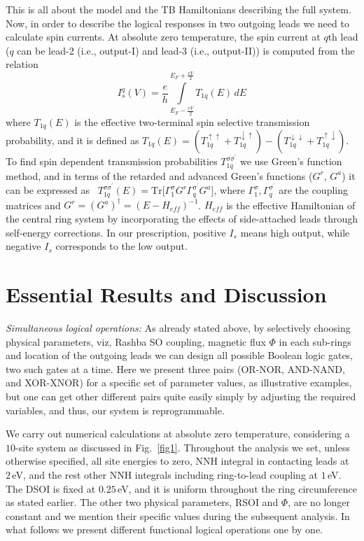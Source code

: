 \documentclass[doublecol]{epl2}
\begin{document}
This is all about the model and the TB Hamiltonians describing the full 
system. Now, in order to describe the logical responses in two outgoing 
leads we need to calculate spin currents. At absolute zero temperature, 
the spin current at $q$th lead ($q$ can be lead-2 (i.e., output-I) and 
lead-3 (i.e., output-II)) is computed from the relation~\cite{datta}
\begin{equation}
I_s^q(V) = \frac{e}{h}
\int\limits_{E_F-\frac{eV}{2}}^{E_F+ \frac{eV}{2}}T_{1q}(E) \, dE
\label{eq3}
\end{equation}
where $T_{1q}(E)$ is the effective two-terminal spin selective transmission 
probability, and it is defined as 
$T_{1q}(E)=(T_{1q}^{\uparrow\uparrow}+T_{1q}^{\downarrow\uparrow})-
(T_{1q}^{\downarrow\downarrow}+T_{1q}^{\uparrow\downarrow})$. To find spin 
dependent transmission probabilities $T_{1q}^{\sigma\sigma^{\prime}}$
we use Green's function method, and in terms of the retarded and advanced 
Green's functions ($G^r$, $G^a$) it can be expressed as~\cite{datta,car,fl} 
$T_{1q}^{\sigma\sigma^{\prime}}(E) = \mbox{Tr}\big[\Gamma_1^{\sigma} 
G^r \Gamma_q^{\sigma^{\prime}} G^a\big]$, where 
$\Gamma_1^{\sigma}, \Gamma_q^{\sigma^{\prime}}$ are the coupling matrices and 
$G^r=(G^a)^{\dagger}=(E-H_{eff})^{-1}$. $H_{eff}$ is the effective Hamiltonian 
of the central ring system by incorporating the effects of side-attached leads 
through self-energy corrections. In our prescription, positive $I_s$ means 
high output, while negative $I_s$ corresponds to the low output.

\section{Essential Results and Discussion}

{\em Simultaneous logical operations:} As already stated above, by selectively 
choosing physical parameters, viz, Rashba SO coupling, magnetic flux $\Phi$
in each sub-rings and location of the outgoing leads we can design all possible 
Boolean logic gates, two such gates at a time. Here we present three pairs 
(OR-NOR, AND-NAND, and XOR-XNOR) for a specific set of parameter values, as
illustrative examples, but one can get other different pairs quite easily 
simply by adjusting the required variables, and thus, our system is 
reprogrammable.

We carry out numerical calculations at absolute zero temperature, considering
a $10$-site system as discussed in Fig.~\ref{fig1}. Throughout the analysis we 
set, unless otherwise specified, all site energies to zero, NNH integral in 
contacting leads at $2\,$eV, and the rest other NNH integrals including 
ring-to-lead coupling at $1\,$eV. The DSOI is fixed at $0.25\,$eV, and it is
uniform throughout the ring circumference as stated earlier. The other
two physical parameters, RSOI and $\Phi$, are no longer constant and we 
mention their specific values during the subsequent analysis. In what 
follows we present different functional logical operations one by one.
\end{document}
